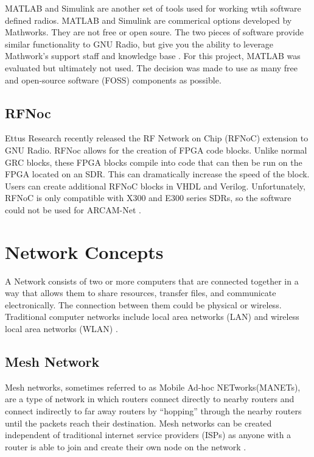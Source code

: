 MATLAB and Simulink are another set of tools used for working wtih software defined radios. MATLAB and Simulink are commerical options developed by Mathworks. They are not free or open soure. The two pieces of software provide similar functionality to GNU Radio, but give you the ability to leverage Mathwork's support staff and knowledge base \cite{0027}. For this project, MATLAB was evaluated but ultimately not used. The decision was made to use as many free and open-source software (FOSS) components as possible. 

\subsection{RFNoc}

Ettus Research recently released the RF Network on Chip (RFNoC) extension to GNU Radio. RFNoc allows for the creation of FPGA code blocks. Unlike normal GRC blocks, these FPGA blocks compile into code that can then be run on the FPGA located on an SDR. This can dramatically increase the speed of the block. Users can create additional RFNoC blocks in VHDL and Verilog. Unfortunately, RFNoC is only compatible with X300 and E300 series SDRs, so the software could not be used for ARCAM-Net \cite{0028}. 


\section{Network Concepts}

A Network consists of two or more computers that are connected together in a way that allows them to share resources, transfer files, and communicate electronically. The connection between them could be physical or wireless. Traditional computer networks include local area networks (LAN) and wireless local area networks (WLAN) \cite{529072} \cite{0029}. 

\subsection{Mesh Network}

Mesh networks, sometimes referred to as Mobile Ad-hoc NETworks(MANETs), are a type of network in which routers connect directly to nearby routers and connect indirectly to far away routers by ``hopping'' through the nearby routers until the packets reach their destination. Mesh networks can be created independent of traditional internet service providers (ISPs) as anyone with a router is able to join and create their own node on the network \cite{6908725}. 

